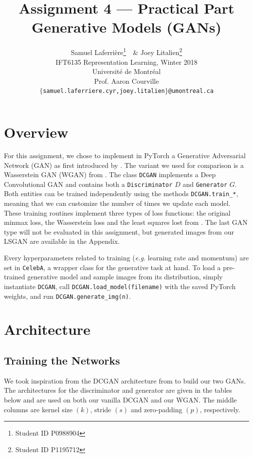 \documentclass[table]{article}
\title{Assignment 4 --- Practical Part \\
Generative Models (GANs)}
\author{Samuel Laferri\`ere\thanks{Student ID P0988904}\ \, \& Joey Litalien\thanks{Student ID P1195712} \\
IFT6135 Representation Learning, Winter 2018\\
Universit\'e de Montr\'eal\\
Prof. Aaron Courville \\
\texttt{$\{$samuel.laferriere.cyr,joey.litalien$\}$@umontreal.ca}}
\def\*#1{\mathbf{#1}}
\newcommand{\code}[1]{{\color{Blue}\small\texttt{#1}}}
\begin{document}
\maketitle
\thispagestyle{empty}

\section{Overview}

For this assignment, we chose to implement in PyTorch a Generative Adversarial Network (GAN) as first introduced by \cite{gan}. The variant we used for comparison is a Wasserstein GAN (WGAN) from \cite{wgan}. The class \code{DCGAN} implements a Deep Convolutional GAN and contains both a \code{Discriminator} $D$ and \code{Generator} $G$. Both entities can be trained independently using the methods \code{DCGAN.train\_*}, meaning that we can customize the number of times we update each model. These training routines implement three types of loss functions: the original minmax loss, the Wasserstein loss and the least squares lost from \cite{lsgan}. The last GAN type will not be evaluated in this assignment, but generated images from our LSGAN are available in the Appendix.

Every hyperparameters related to training (\textit{e.g.} learning rate and momentum) are set in \code{CelebA}, a wrapper class for the generative task at hand. To load a pre-trained generative model and sample images from its distribution, simply instantiate \code{DCGAN}, call \code{DCGAN.load_model(filename)} with the saved PyTorch weights, and run \code{DCGAN.generate_img(n)}.


\section{Architecture}
\subsection{Training the Networks}

We took inspiration from the DCGAN architecture from \cite{dcgan} to build our two GANs. The architectures for the discriminator and generator are given in the tables below and are used on both our vanilla DCGAN and our WGAN. The middle columns are kernel size $(k)$, stride $(s)$ and zero-padding $(p)$, respectively.
\end{document}
